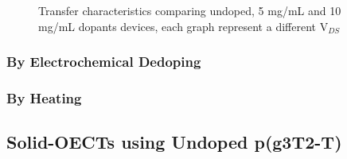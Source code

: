\begin{figure}[!ht]
    \centering
    \caption[Reversing oxidation of undoped-p(g3T2-T)]{Transfer characteristics comparing undoped, 5 mg/mL and 10 mg/mL dopants devices, each graph represent a different V$_{DS }$}
    \label{fig:revox2}
\end{figure}

\subsubsection{By Electrochemical Dedoping}

\subsubsection{By Heating}


\subsection{Solid-OECTs using Undoped p(g3T2-T)}




